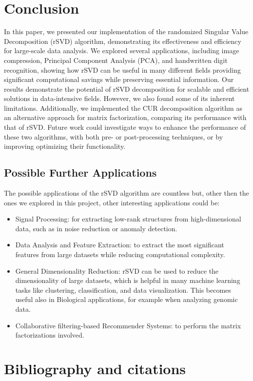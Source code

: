 \documentclass[11pt,a4paper]{article}
\begin{document}
\section{Conclusion}
In this paper, we presented our implementation of the randomized Singular Value Decomposition (rSVD) algorithm, demonstrating its effectiveness and efficiency for large-scale data analysis. We explored several applications, including image compression, Principal Component Analysis (PCA), and handwritten digit recognition, showing how rSVD can be useful in many different fields providing significant computational savings while preserving essential information. Our results demonstrate the potential of rSVD decomposition for scalable and efficient solutions in data-intensive fields. However, we also found some of its inherent limitations. Additionally, we implemented the CUR decomposition algorithm as an alternative approach for matrix factorization, comparing its performance with that of rSVD. Future work could investigate ways to enhance the performance of these two algorithms, with both pre- or post-processing techniques, or by improving optimizing their functionality. 

\subsection{Possible Further Applications}
The possible applications of the rSVD algorithm are countless but, other then the ones we explored in this project, other interesting applications could be:
\begin{itemize}
    \item Signal Processing: for extracting low-rank structures from high-dimensional data, such as in noise reduction or anomaly detection.
    \item Data Analysis and Feature Extraction:  to extract the most significant features from large datasets while reducing computational complexity.
    \item General Dimensionality Reduction: rSVD can be used to reduce the dimensionality of large datasets, which is helpful in many machine learning tasks like clustering, classification, and data visualization. This becomes useful also in Biological applications, for example when analyzing genomic data.
    \item Collaborative filtering-based Recommender Systems: to perform the matrix factorizations involved.    
\end{itemize}

\section{Bibliography and citations}
\end{document}
